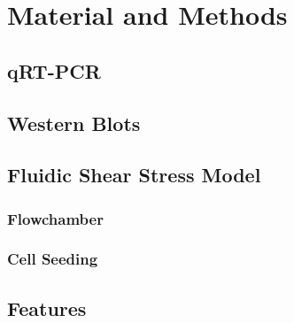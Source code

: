 \renewcommand{\package}{\emph}

\chapter{Material and Methods}

\section{qRT-PCR}

\section{Western Blots}

\section{Fluidic Shear Stress Model}

\subsection{Flowchamber}
\subsection{Cell Seeding}

\section{Features}

